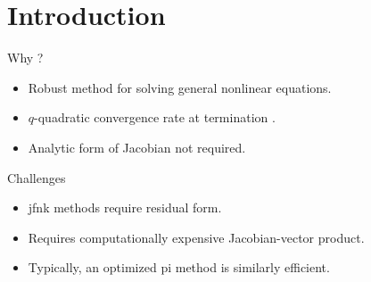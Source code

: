 \section{Introduction}
\label{sec:introduction}

\begin{frame}{Why ?}
  \begin{itemize}
    \item Robust method for solving general nonlinear equations.
    \item $q$-quadratic convergence rate at termination \cite{textbookkelley}.
    \item Analytic form of Jacobian not required.
  \end{itemize}
\end{frame}

\begin{frame}{ Challenges}
  \begin{itemize}
    \item \gls{jfnk} methods require residual form.
    \item Requires computationally expensive Jacobian-vector product.
    \item Typically, an optimized \gls{pi} method is similarly efficient.
  \end{itemize}
\end{frame}
